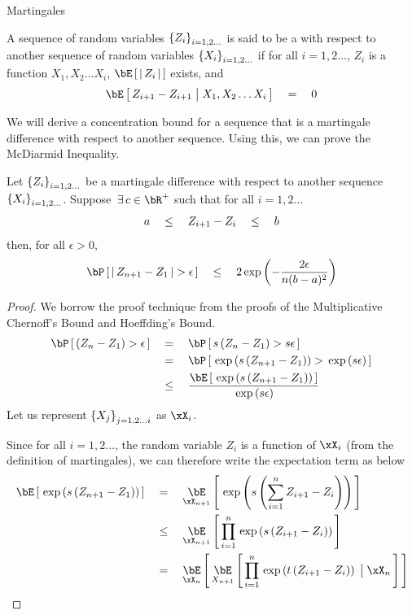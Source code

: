 \documentclass{article}
\begin{document}
\begin{ssection}{Martingales}
	\begin{definition}
		A sequence of random variables $\left\{ {Z_i} \right\}_{i = 1, 2 \dots}$ is said to be a  with respect to another sequence of random variables $\left\{ {X_i} \right\}_{i = 1, 2 \dots}$ if for all $i = 1, 2 \dots$, $Z_i$ is a function $X_1, X_2 \dots X_i$, $\E{\abs{Z_i}}$ exists, and
		\begin{align*}
			\E{Z_{i + 1} - Z_{i + 1} \pipe X_1, X_2 \dots X_i}	\eq	0 
		\end{align*}
		\label{def:maringale-difference}
	\end{definition}
	
	We will derive a concentration bound for a sequence that is a martingale difference with respect to another sequence. Using this, we can prove the McDiarmid Inequality. \br
	
	\begin{theorem}
		Let $\left\{ {Z_i} \right\}_{i = 1, 2 \dots}$ be a martingale difference with respect to another sequence $\left\{ {X_i} \right\}_{i = 1, 2 \dots}$. Suppose $\qexists c \in \bR^+$ such that for all $i = 1, 2 \dots$
		\begin{align*}
			a	\quad \le \quad	Z_{i + 1} - Z_i	\quad \le \quad	b 
		\end{align*}
		then, for all $\epsilon > 0$,
		\begin{equation}
			\prob{\abs{Z_{n + 1} - Z_1} > \epsilon}	\qle	2 \texp{-\frac{2\epsilon}{n(b - a)^2}}
			\label{eq:azuma}
		\end{equation}
		\label{th:azuma}
	\end{theorem}
	
	\begin{proof}
		We borrow the proof technique from the proofs of the Multiplicative Chernoff's Bound and Hoeffding's Bound.
		\begin{align*}
			\prob{\para{Z_n - Z_1} > \epsilon} & \eq	\prob{s \para{Z_n - Z_1} > s \epsilon}                         \\
			                                   & \eq	\prob{\texp{s \para{Z_{n + 1} - Z_1}} > \texp{s \epsilon}}     \\
			                                   & \qle	\frac{\E{\texp{s \para{Z_{n + 1} - Z_1}}}}{\texp{s \epsilon}} 
		\end{align*}
		Let us represent $\left\{ {X_j} \right\}_{j = 1, 2 \dots i}$ as $\xX_i$.
		
		Since for all $i = 1, 2 \dots$, the random variable $Z_i$ is a function of $\xX_i$ (from the definition of martingales), we can therefore write the expectation term as below
		\begin{align*}
			\E{\texp{s \para{Z_{n + 1} - Z_1}}} & \eq	\E[\xX_{n + 1}]{\texp{s \para{\sum_{i = 1}^n Z_{i + 1} - Z_i}}}                       \\
			                                    & \qle	\E[\xX_{n + 1}]{\prod_{i = 1}^n \texp{s \para{Z_{i + 1} - Z_i}}}                     \\
			                                    & \eq	\E[\xX_n]{\E[X_{n + 1}]{\prod_{i = 1}^n \texp{t \para{Z_{i + 1} - Z_i}} \pipe \xX_n}} 
		\end{align*}
		

\end{proof}
\end{ssection}
\end{document}
